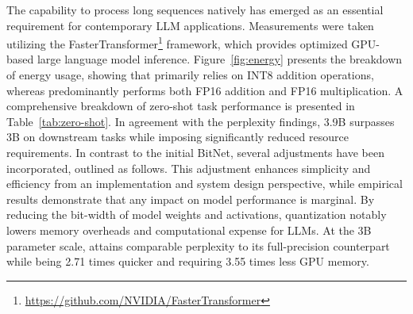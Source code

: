 The capability to process long sequences natively has emerged as an essential requirement for contemporary LLM applications. Measurements were taken utilizing the FasterTransformer\footnote{\url{https://github.com/NVIDIA/FasterTransformer}} framework, which provides optimized GPU-based large language model inference. Figure~\ref{fig:energy} presents the breakdown of energy usage, showing that  primarily relies on INT8 addition operations, whereas  predominantly performs both FP16 addition and FP16 multiplication. A comprehensive breakdown of zero-shot task performance is presented in Table~\ref{tab:zero-shot}. In agreement with the perplexity findings,  3.9B surpasses  3B on downstream tasks while imposing significantly reduced resource requirements. In contrast to the initial BitNet, several adjustments have been incorporated, outlined as follows. This adjustment enhances simplicity and efficiency from an implementation and system design perspective, while empirical results demonstrate that any impact on model performance is marginal. By reducing the bit-width of model weights and activations, quantization notably lowers memory overheads and computational expense for LLMs. At the 3B parameter scale,  attains comparable perplexity to its full-precision  counterpart while being 2.71 times quicker and requiring 3.55 times less GPU memory. 

